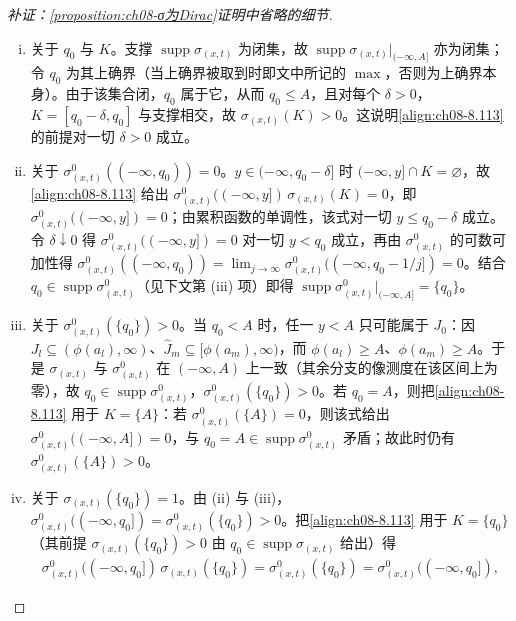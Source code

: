 \documentclass[../../main.tex]{subfiles}%
\begin{document}
\begin{proof}[补证：\cref{proposition:ch08-σ为Dirac}证明中省略的细节]
\begin{enumerate}[(i)]
\item 关于 $q_0$ 与 $K$。支撑 $\operatorname{supp}\sigma_{(x,t)}$ 为闭集，故 $\operatorname{supp}\sigma_{(x,t)}|_{(-\infty,A]}$ 亦为闭集；令 $q_0$ 为其上确界（当上确界被取到时即文中所记的 $\max$，否则为上确界本身）。由于该集合闭，$q_0$ 属于它，从而 $q_0\leqslant A$，且对每个 $\delta>0$，$K=[q_0-\delta,q_0]$ 与支撑相交，故 $\sigma_{(x,t)}(K)>0$。这说明\eqref{align:ch08-8.113} 的前提对一切 $\delta>0$ 成立。
\item 关于 $\sigma^0_{(x,t)}((-\infty,q_0))=0$。$y\in(-\infty,q_0-\delta]$ 时 $(-\infty,y]\cap K=\varnothing$，故\eqref{align:ch08-8.113} 给出 $\sigma^0_{(x,t)}((-\infty,y])\,\sigma_{(x,t)}(K)=0$，即 $\sigma^0_{(x,t)}((-\infty,y])=0$；由累积函数的单调性，该式对一切 $y\leqslant q_0-\delta$ 成立。令 $\delta\downarrow0$ 得 $\sigma^0_{(x,t)}((-\infty,y])=0$ 对一切 $y<q_0$ 成立，再由 $\sigma^0_{(x,t)}$ 的可数可加性得 $\sigma^0_{(x,t)}((-\infty,q_0))=\lim_{j\to\infty}\sigma^0_{(x,t)}((-\infty,q_0-1/j])=0$。结合 $q_0\in\operatorname{supp}\sigma^0_{(x,t)}$（见下文第 (iii) 项）即得 $\operatorname{supp}\sigma^0_{(x,t)}|_{(-\infty,A]}=\{q_0\}$。
\item 关于 $\sigma^0_{(x,t)}(\{q_0\})>0$。当 $q_0<A$ 时，任一 $y<A$ 只可能属于 $J_0$：因 $J_l\subseteq(\phi(a_l),\infty)$、$\widehat J_m\subseteq[\phi(a_m),\infty)$，而 $\phi(a_l)\geqslant A$、$\phi(a_m)\geqslant A$。于是 $\sigma_{(x,t)}$ 与 $\sigma^0_{(x,t)}$ 在 $(-\infty,A)$ 上一致（其余分支的像测度在该区间上为零），故 $q_0\in\operatorname{supp}\sigma^0_{(x,t)}$，$\sigma^0_{(x,t)}(\{q_0\})>0$。若 $q_0=A$，则把\eqref{align:ch08-8.113} 用于 $K=\{A\}$：若 $\sigma^0_{(x,t)}(\{A\})=0$，则该式给出 $\sigma^0_{(x,t)}((-\infty,A])=0$，与 $q_0=A\in\operatorname{supp}\sigma^0_{(x,t)}$ 矛盾；故此时仍有 $\sigma^0_{(x,t)}(\{A\})>0$。
\item 关于 $\sigma_{(x,t)}(\{q_0\})=1$。由 (ii) 与 (iii)，$\sigma^0_{(x,t)}((-\infty,q_0])=\sigma^0_{(x,t)}(\{q_0\})>0$。把\eqref{align:ch08-8.113} 用于 $K=\{q_0\}$（其前提 $\sigma_{(x,t)}(\{q_0\})>0$ 由 $q_0\in\operatorname{supp}\sigma_{(x,t)}$ 给出）得
\begin{align*}
\sigma^0_{(x,t)}((-\infty,q_0])\,\sigma_{(x,t)}(\{q_0\})=\sigma^0_{(x,t)}(\{q_0\})=\sigma^0_{(x,t)}((-\infty,q_0]),

\end{align*}
\end{enumerate}
\end{proof}
\end{document}
